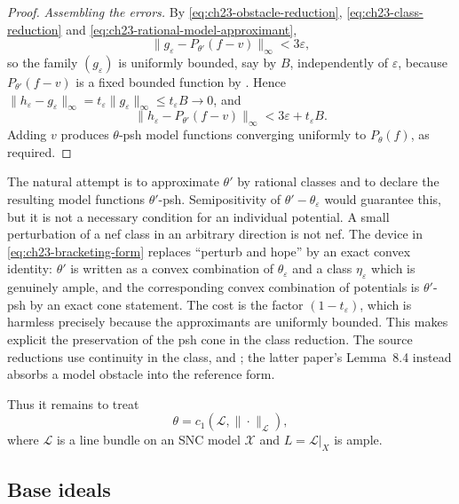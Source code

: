 \begin{proof}
\emph{Assembling the errors.}
By \eqref{eq:ch23-obstacle-reduction},
\eqref{eq:ch23-class-reduction} and
\eqref{eq:ch23-rational-model-approximant},
\[
 \|g_\varepsilon-P_{\theta'}(f-v)\|_\infty<3\varepsilon,
\]
so the family $(g_\varepsilon)$ is uniformly bounded, say by $B$,
independently of $\varepsilon$, because $P_{\theta'}(f-v)$ is a fixed
bounded function by .  Hence
$\|h_\varepsilon-g_\varepsilon\|_\infty
=t_\varepsilon\|g_\varepsilon\|_\infty\leq t_\varepsilon B\to0$, and
\[
 \|h_\varepsilon-P_{\theta'}(f-v)\|_\infty
 <3\varepsilon+t_\varepsilon B .
\]
Adding $v$ produces $\theta$-psh model functions converging uniformly to
$P_\theta(f)$, as required.
\end{proof}

\begin{remark}
\label{rem:ch23-curvature-correction}
The natural attempt is to approximate $\theta'$ by rational classes and to
declare the resulting model functions $\theta'$-psh.  Semipositivity of
$\theta'-\theta_\varepsilon$ would guarantee this, but it is not a
necessary condition for an individual potential.  A small
perturbation of a nef class in an arbitrary direction is not nef.  The
device in \eqref{eq:ch23-bracketing-form} replaces ``perturb and hope'' by an
exact convex identity: $\theta'$ is written as a convex combination of
$\theta_\varepsilon$ and a class $\eta_\varepsilon$ which is genuinely
ample, and the corresponding convex combination of potentials is
$\theta'$-psh by an exact cone statement.  The cost is the factor
$(1-t_\varepsilon)$, which is harmless precisely because the approximants
are uniformly bounded.  This makes explicit the preservation of the psh
cone in the class reduction.  The source reductions use continuity in the
class, \cite[Proposition~8.2(vii) and proof of Theorem~8.3]{BFJ16} and
\cite[Proposition~2.9(6)]{GJKM19}; the latter paper's Lemma~8.4 instead
absorbs a model obstacle into the reference form.
\end{remark}

Thus it remains to treat
\begin{equation}\label{eq:ch23-integral-reference}
             \theta=c_1(\mathcal L,\|\cdot\|_{\mathcal L}),
\end{equation}
where $\mathcal L$ is a line bundle on an SNC model $\mathcal X$ and
$L=\mathcal L|_X$ is ample.

\subsection{Base ideals}
\label{sec:ch23-base-ideals}

